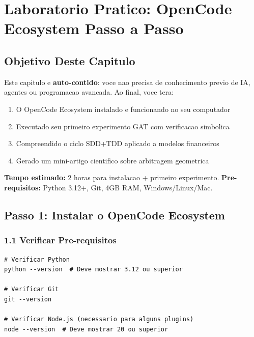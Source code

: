 \chapter{Laboratorio Pratico: OpenCode Ecosystem Passo a Passo}

\section{Objetivo Deste Capitulo}

Este capitulo e \textbf{auto-contido}: voce nao precisa de conhecimento previo
de IA, agentes ou programacao avancada. Ao final, voce tera:

\begin{enumerate}[nosep]
 \item O OpenCode Ecosystem instalado e funcionando no seu computador
 \item Executado seu primeiro experimento GAT com verificacao simbolica
 \item Compreendido o ciclo SDD+TDD aplicado a modelos financeiros
 \item Gerado um mini-artigo cientifico sobre arbitragem geometrica
\end{enumerate}

\textbf{Tempo estimado:} 2 horas para instalacao + primeiro experimento.
\textbf{Pre-requisitos:} Python 3.12+, Git, 4GB RAM, Windows/Linux/Mac.

\section{Passo 1: Instalar o OpenCode Ecosystem}

\subsection{1.1 Verificar Pre-requisitos}

\begin{lstlisting}[caption={Verificar ambiente}, label=lst:check]
# Verificar Python
python --version  # Deve mostrar 3.12 ou superior

# Verificar Git
git --version

# Verificar Node.js (necessario para alguns plugins)
node --version  # Deve mostrar 20 ou superior
\end{lstlisting}

